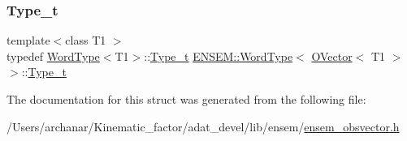 \mbox{\label{structENSEM_1_1WordType_3_01OVector_3_01T1_01_4_01_4_ab09c111517a85cf22c58611d96219000}} 
\subsubsection{\texorpdfstring{Type\_t}{Type\_t}\hspace{0.1cm}{\footnotesize\ttfamily [2/2]}}
{\footnotesize\ttfamily template$<$class T1 $>$ \\
typedef \mbox{\hyperlink{structENSEM_1_1WordType}{Word\+Type}}$<$T1$>$\+::\mbox{\hyperlink{structENSEM_1_1WordType_3_01OVector_3_01T1_01_4_01_4_ab09c111517a85cf22c58611d96219000}{Type\+\_\+t}} \mbox{\hyperlink{structENSEM_1_1WordType}{E\+N\+S\+E\+M\+::\+Word\+Type}}$<$ \mbox{\hyperlink{classENSEM_1_1OVector}{O\+Vector}}$<$ T1 $>$ $>$\+::\mbox{\hyperlink{structENSEM_1_1WordType_3_01OVector_3_01T1_01_4_01_4_ab09c111517a85cf22c58611d96219000}{Type\+\_\+t}}}



The documentation for this struct was generated from the following file\+:\begin{DoxyCompactItemize}
\item 
/\+Users/archanar/\+Kinematic\+\_\+factor/adat\+\_\+devel/lib/ensem/\mbox{\hyperlink{lib_2ensem_2ensem__obsvector_8h}{ensem\+\_\+obsvector.\+h}}\end{DoxyCompactItemize}
